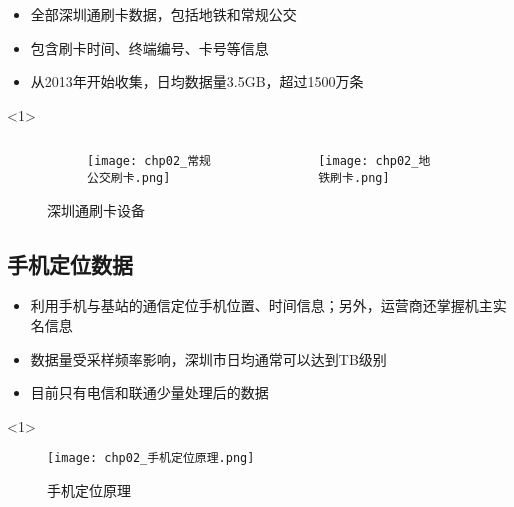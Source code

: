 \begin{frame}[t]{\subsecname}
\begin{itemize}
\item<1-> 全部深圳通刷卡数据，包括地铁和常规公交
\item<1-> 包含刷卡时间、终端编号、卡号等信息
\item<2-> 从2013年开始收集，日均数据量3.5GB，超过1500万条
\end{itemize}

\begin{overlayarea}{\textwidth}{\textheight}
  \begin{onlyenv}<1>
\begin{figure} \centering
\begin{columns}[b]
  \begin{column}{.5\textwidth}
    \begin{figure}\flushright
      \texttt{[image: chp02\_常规公交刷卡.png]}
    \end{figure}
  \end{column}
  \begin{column}{.5\textwidth}
    \begin{figure}\flushleft
      \texttt{[image: chp02\_地铁刷卡.png]}
    \end{figure}
  \end{column}
\end{columns}
\caption{深圳通刷卡设备} 
\end{figure}
  \end{onlyenv}
\end{overlayarea}
\end{frame}

\subsection{手机定位数据}
 
\begin{frame}[t]{\subsecname}
\begin{itemize}
\item<1-> 利用手机与基站的通信定位手机位置、时间信息；另外，运营商还掌握机主实名信息
\item<2-> 数据量受采样频率影响，深圳市日均通常可以达到TB级别
\item<2-> 目前只有电信和联通少量处理后的数据
\end{itemize}

\begin{overlayarea}{\textwidth}{\textheight}
\vspace{-5pt}
  \begin{onlyenv}<1>
\begin{figure}
  \centering
  \texttt{[image: chp02\_手机定位原理.png]}
  \caption{手机定位原理}
\end{figure}
  \end{onlyenv}
\end{overlayarea}
\end{frame}

